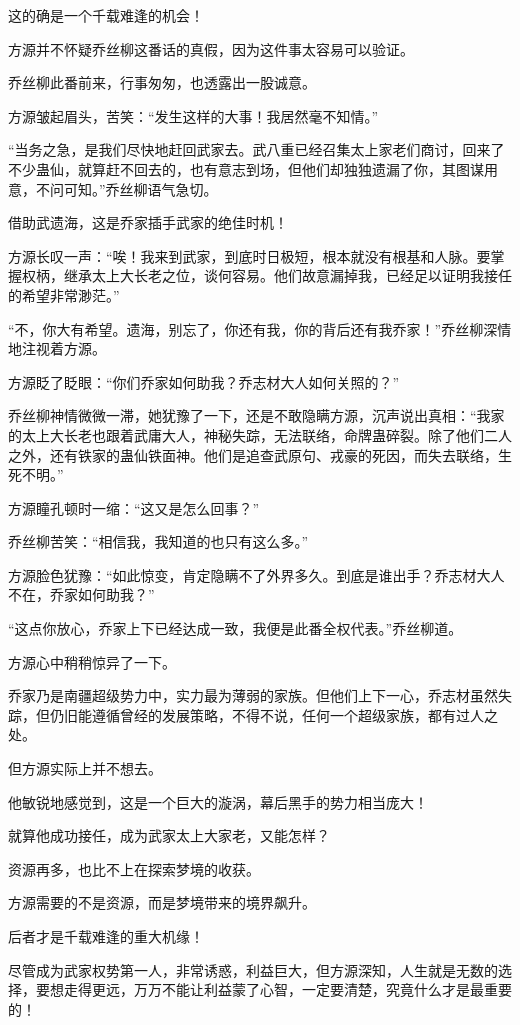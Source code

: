 \begin{this_body}
这的确是一个千载难逢的机会！

方源并不怀疑乔丝柳这番话的真假，因为这件事太容易可以验证。

乔丝柳此番前来，行事匆匆，也透露出一股诚意。

方源皱起眉头，苦笑：“发生这样的大事！我居然毫不知情。”

“当务之急，是我们尽快地赶回武家去。武八重已经召集太上家老们商讨，回来了不少蛊仙，就算赶不回去的，也有意志到场，但他们却独独遗漏了你，其图谋用意，不问可知。”乔丝柳语气急切。

借助武遗海，这是乔家插手武家的绝佳时机！

方源长叹一声：“唉！我来到武家，到底时日极短，根本就没有根基和人脉。要掌握权柄，继承太上大长老之位，谈何容易。他们故意漏掉我，已经足以证明我接任的希望非常渺茫。”

“不，你大有希望。遗海，别忘了，你还有我，你的背后还有我乔家！”乔丝柳深情地注视着方源。

方源眨了眨眼：“你们乔家如何助我？乔志材大人如何关照的？”

乔丝柳神情微微一滞，她犹豫了一下，还是不敢隐瞒方源，沉声说出真相：“我家的太上大长老也跟着武庸大人，神秘失踪，无法联络，命牌蛊碎裂。除了他们二人之外，还有铁家的蛊仙铁面神。他们是追查武原句、戎豪的死因，而失去联络，生死不明。”

方源瞳孔顿时一缩：“这又是怎么回事？”

乔丝柳苦笑：“相信我，我知道的也只有这么多。”

方源脸色犹豫：“如此惊变，肯定隐瞒不了外界多久。到底是谁出手？乔志材大人不在，乔家如何助我？”

“这点你放心，乔家上下已经达成一致，我便是此番全权代表。”乔丝柳道。

方源心中稍稍惊异了一下。

乔家乃是南疆超级势力中，实力最为薄弱的家族。但他们上下一心，乔志材虽然失踪，但仍旧能遵循曾经的发展策略，不得不说，任何一个超级家族，都有过人之处。

但方源实际上并不想去。

他敏锐地感觉到，这是一个巨大的漩涡，幕后黑手的势力相当庞大！

就算他成功接任，成为武家太上大家老，又能怎样？

资源再多，也比不上在探索梦境的收获。

方源需要的不是资源，而是梦境带来的境界飙升。

后者才是千载难逢的重大机缘！

尽管成为武家权势第一人，非常诱惑，利益巨大，但方源深知，人生就是无数的选择，要想走得更远，万万不能让利益蒙了心智，一定要清楚，究竟什么才是最重要的！


\end{this_body}
